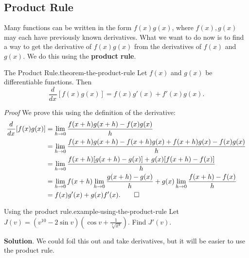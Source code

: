 \documentclass[10pt,]{book}
\makeatletter
\newcommand{\terminology}[1]{\textbf{#1}}
\renewcommand*{\proofname}{Proof}
\renewenvironment{proof}[1][\proofname]{\par
  \pushQED{\qed}%
  \normalfont \topsep6\p@\@plus6\p@\relax
  \trivlist
  \item\relax
    {\itshape
    #1\@addpunct{.}}\hspace\labelsep\ignorespaces
}{%
  \popQED\endtrivlist\@endpefalse
}
\numberwithin{equation}{section}
\newcommand{\dv}[3][]{\dfrac{d^{#1} #2}{d #3^{#1}}}
\makeatother
\begin{document}
\subsection[{Product Rule}]{Product Rule}\label{subsection-product-rule}
\hypertarget{p-139}{}%
Many functions can be written in the form \(f(x)g(x)\), where \(f(x),g(x)\) may each have previously known derivatives. What we want to do now is to find a way to get the derivative of \(f(x)g(x)\) from the derivatives of \(f(x)\) and \(g(x)\). We do this using the \terminology{product rule}.%
\begin{theorem}{The Product Rule.}{}{theorem-the-product-rule}%
\hypertarget{p-140}{}%
Let \(f(x)\) and \(g(x)\) be differentiable functions. Then%
\begin{equation*}
\dv{}{x}[f(x)g(x)] = f(x)g'(x) + f'(x)g(x).
\end{equation*}
%
\end{theorem}
\begin{proof}\hypertarget{proof-3}{}
\hypertarget{p-141}{}%
We prove this using the definition of the derivative:%
\begin{align*}
\dv{}{x}[f(x)g(x)] & = \lim_{h\to0}\frac{f(x+h)g(x+h) - f(x)g(x)}{h} \\
& = \lim_{h\to0}\frac{f(x+h)g(x+h) - f(x+h)g(x) + f(x+h)g(x) - f(x)g(x)}{h} \\
& = \lim_{h\to0}\frac{f(x+h)[g(x+h) - g(x)] + g(x)[f(x+h) - f(x)]}{h} \\
& = \lim_{h\to0}f(x+h)\lim_{h\to0}\frac{g(x+h) - g(x)}{h} + g(x)\lim_{h\to0}\frac{f(x+h) - f(x)}{h} \\
& = f(x)g'(x) + g(x)f'(x). \qedhere
\end{align*}
%
\end{proof}
\begin{example}{Using the product rule.}{example-using-the-product-rule}%
\hypertarget{p-142}{}%
Let \(J(v) = (v^{10} - 2\sin v)(\cos v + \frac{1}{\sqrt[3]{x^{4}}})\). Find \(J'(v)\).%
\par\smallskip%
\noindent\textbf{Solution}.\hypertarget{solution-28}{}\quad%
\hypertarget{p-143}{}%
We could foil this out and take derivatives, but it will be easier to use the product rule.%
\end{example}
%
%
\typeout{************************************************}
\typeout{************************************************}
%
\end{document}
